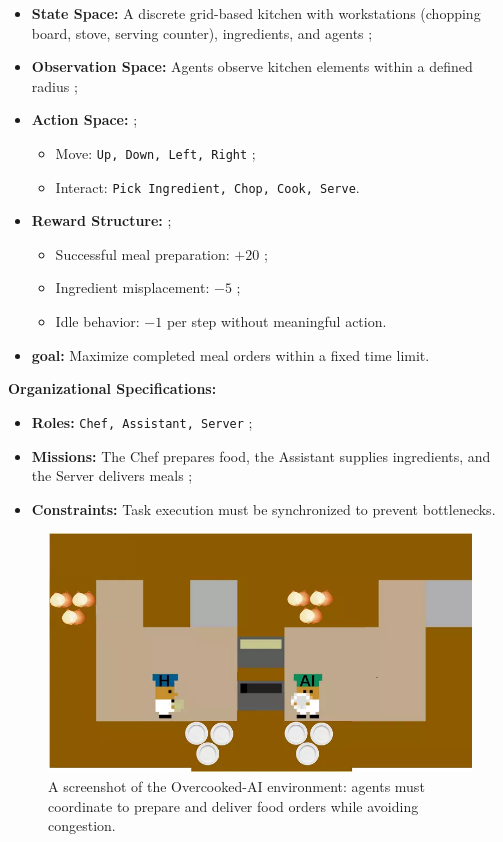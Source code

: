 \documentclass[pdflatex,sn-mathphys-num]{sn-jnl}%
\theoremstyle{thmstyleone}%
\theoremstyle{thmstyletwo}%
\theoremstyle{thmstylethree}%
\begin{document}
\begin{itemize}
    \item \textbf{State Space:} A discrete grid-based kitchen with workstations (chopping board, stove, serving counter), ingredients, and agents ;
    \item \textbf{Observation Space:} Agents observe kitchen elements within a defined radius ;
    \item \textbf{Action Space:}  ;
    \begin{itemize}
        \item Move: \texttt{Up, Down, Left, Right} ;
        \item Interact: \texttt{Pick Ingredient, Chop, Cook, Serve}.
    \end{itemize}
    \item \textbf{Reward Structure:} ;
    \begin{itemize}
        \item Successful meal preparation: $+20$ ;
        \item Ingredient misplacement: $-5$ ;
        \item Idle behavior: $-1$ per step without meaningful action.
    \end{itemize}
    \item \textbf{goal:} Maximize completed meal orders within a fixed time limit.
\end{itemize}

\textbf{Organizational Specifications:} 
\begin{itemize}
    \item \textbf{Roles:} \texttt{Chef, Assistant, Server} ;
    \item \textbf{Missions:} The Chef prepares food, the Assistant supplies ingredients, and the Server delivers meals ;
    \item \textbf{Constraints:} Task execution must be synchronized to prevent bottlenecks.
\end{itemize}

\begin{figure}[h!]
    \centering
    \includegraphics[width=0.7\linewidth]{figures/overcooked.png}
    \caption{A screenshot of the Overcooked-AI environment: agents must coordinate to prepare and deliver food orders while avoiding congestion.}
    \label{fig:overcooked}
\end{figure}
\end{document}
